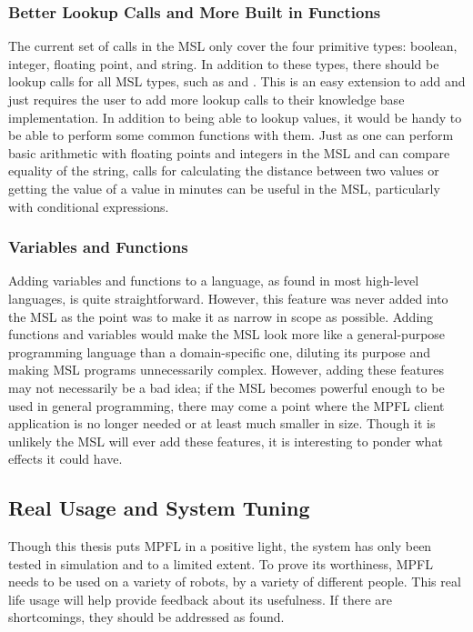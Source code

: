 \subsubsection{Better Lookup Calls and More Built in Functions}
The current set of  calls in the MSL only cover the four primitive types: boolean, integer, floating point, and string. In addition to these types, there should be lookup calls for all MSL types, such as  and . This is an easy extension to add and just requires the user to add more lookup calls to their knowledge base implementation. In addition to being able to lookup values, it would be handy to be able to perform some common functions with them. Just as one can perform basic arithmetic with floating points and integers in the MSL and can compare equality of the string, calls for calculating the distance between two  values or getting the value of a  value in minutes can be useful in the MSL, particularly with conditional expressions.

\subsubsection{Variables and Functions}
Adding variables and functions to a language, as found in most high-level languages, is quite straightforward. However, this feature was never added into the MSL as the point was to make it as narrow in scope as possible. Adding functions and variables would make the MSL look more like a general-purpose programming language than a domain-specific one, diluting its purpose and making MSL programs unnecessarily complex. However, adding these features may not necessarily be a bad idea; if the MSL becomes powerful enough to be used in general programming, there may come a point where the MPFL client application is no longer needed or at least much smaller in size. Though it is unlikely the MSL will ever add these features, it is interesting to ponder what effects it could have.

\subsection{Real Usage and System Tuning}
Though this thesis puts MPFL in a positive light, the system has only been tested in simulation and to a limited extent. To prove its worthiness, MPFL needs to be used on a variety of robots, by a variety of different people.  This real life usage will help provide feedback about its usefulness. If there are shortcomings, they should be addressed as found. 


